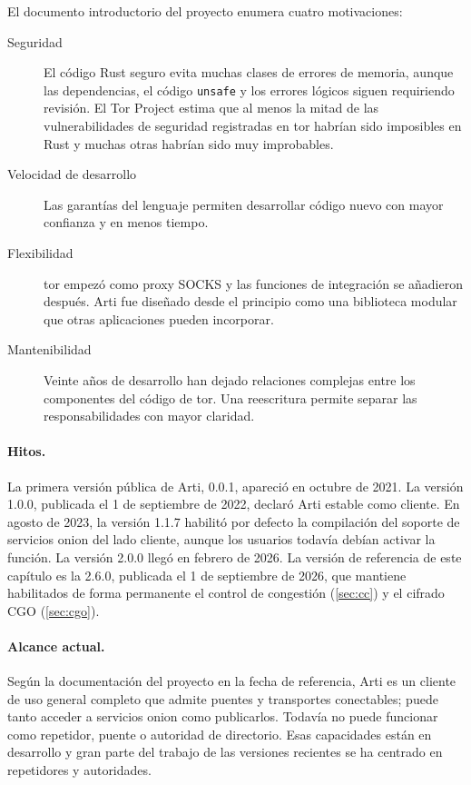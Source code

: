 El documento introductorio del proyecto enumera cuatro motivaciones:
\begin{description}
  \item[Seguridad] El código Rust seguro evita muchas clases de errores de memoria, aunque las dependencias, el código \texttt{unsafe} y los errores lógicos siguen requiriendo revisión. El Tor Project estima que al menos la mitad de las vulnerabilidades de seguridad registradas en tor habrían sido imposibles en Rust y muchas otras habrían sido muy improbables.
  \item[Velocidad de desarrollo] Las garantías del lenguaje permiten desarrollar código nuevo con mayor confianza y en menos tiempo.
  \item[Flexibilidad] tor empezó como proxy SOCKS y las funciones de integración se añadieron después. Arti fue diseñado desde el principio como una biblioteca modular que otras aplicaciones pueden incorporar.
  \item[Mantenibilidad] Veinte años de desarrollo han dejado relaciones complejas entre los componentes del código de tor. Una reescritura permite separar las responsabilidades con mayor claridad.
\end{description}

\paragraph{Hitos.} La primera versión pública de Arti, 0.0.1, apareció en octubre de 2021. La versión 1.0.0, publicada el 1 de septiembre de 2022, declaró Arti estable como cliente. En agosto de 2023, la versión 1.1.7 habilitó por defecto la compilación del soporte de servicios onion del lado cliente, aunque los usuarios todavía debían activar la función. La versión 2.0.0 llegó en febrero de 2026. La versión de referencia de este capítulo es la 2.6.0, publicada el 1 de septiembre de 2026, que mantiene habilitados de forma permanente el control de congestión (\cref{sec:cc}) y el cifrado CGO (\cref{sec:cgo}).

\paragraph{Alcance actual.} Según la documentación del proyecto en la fecha de referencia, Arti es un cliente de uso general completo que admite puentes y transportes conectables; puede tanto acceder a servicios onion como publicarlos. Todavía no puede funcionar como repetidor, puente o autoridad de directorio. Esas capacidades están en desarrollo y gran parte del trabajo de las versiones recientes se ha centrado en repetidores y autoridades.


